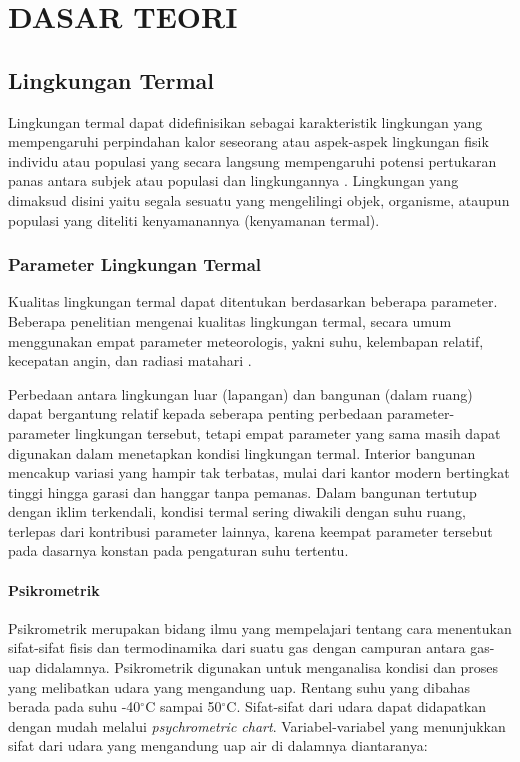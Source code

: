 \chapter{DASAR TEORI}
\label{dasar-teori}

\section{Lingkungan Termal}

Lingkungan termal dapat didefinisikan sebagai karakteristik lingkungan yang mempengaruhi perpindahan kalor seseorang \cite{ASHRAE55} atau aspek-aspek lingkungan fisik individu atau populasi yang secara langsung mempengaruhi potensi pertukaran panas antara subjek atau populasi dan lingkungannya \cite{book1}. Lingkungan yang dimaksud disini yaitu segala sesuatu yang mengelilingi objek, organisme, ataupun populasi yang diteliti kenyamanannya (kenyamanan termal).

\subsection{Parameter Lingkungan Termal}

Kualitas lingkungan termal dapat ditentukan berdasarkan beberapa parameter. Beberapa penelitian mengenai kualitas lingkungan termal, secara umum menggunakan empat parameter meteorologis, yakni suhu, kelembapan relatif, kecepatan angin, dan radiasi matahari \cite{book1}.

Perbedaan antara lingkungan luar (lapangan) dan bangunan (dalam ruang) dapat bergantung relatif kepada seberapa penting perbedaan parameter-parameter lingkungan tersebut, tetapi empat parameter yang sama masih dapat digunakan dalam menetapkan kondisi lingkungan termal. Interior bangunan mencakup variasi yang hampir tak terbatas, mulai dari kantor modern bertingkat tinggi hingga garasi dan hanggar tanpa pemanas. Dalam bangunan tertutup dengan iklim terkendali, kondisi termal sering diwakili dengan suhu ruang, terlepas dari kontribusi parameter lainnya, karena keempat parameter tersebut pada dasarnya konstan pada pengaturan suhu tertentu.

\subsubsection{Psikrometrik}

Psikrometrik merupakan bidang ilmu yang mempelajari tentang cara menentukan sifat-sifat fisis dan termodinamika dari suatu gas dengan campuran antara gas-uap didalamnya. Psikrometrik digunakan untuk menganalisa kondisi dan proses yang melibatkan udara yang mengandung uap. Rentang suhu yang dibahas berada pada suhu -40$^\circ$C sampai 50$^\circ$C. Sifat-sifat dari udara dapat didapatkan dengan mudah melalui \textit{psychrometric chart}. Variabel-variabel yang menunjukkan sifat dari udara yang mengandung uap air di dalamnya diantaranya:\cite{skripsiIchfan}

